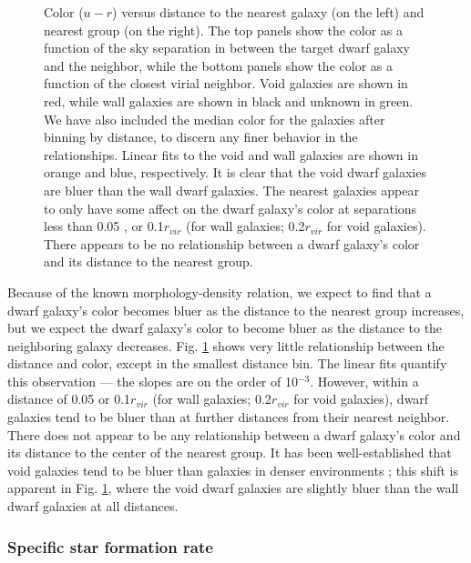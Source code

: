 \begin{figure}
    \caption[$u-r$ versus distance to nearest neighbor and group]{Color ($u-r$) 
    versus distance to the nearest galaxy (on the left) and nearest group (on 
    the right).  The top panels show the color as a function of the sky 
    separation in \hMpc between the target dwarf galaxy and the neighbor, while 
    the bottom panels show the color as a function of the closest virial 
    neighbor.  Void galaxies are shown in red, while wall galaxies are shown in 
    black and unknown in green.  We have also included the median color for the 
    galaxies after binning by distance, to discern any finer behavior in the 
    relationships.  Linear fits to the void and wall galaxies are shown in 
    orange and blue, respectively.  It is clear that the void dwarf galaxies are 
    bluer than the wall dwarf galaxies.  The nearest galaxies appear to only 
    have some affect on the dwarf galaxy's color at separations less than 0.05 
    \hMpc, or 0.1$r_{vir}$ (for wall galaxies; 0.2$r_{vir}$ for void galaxies).  
    There appears to be no relationship between a dwarf galaxy's color and its 
    distance to the nearest group.}
    \label{fig:ur}
\end{figure}

Because of the known morphology-density relation, we expect to find that a dwarf 
galaxy's color becomes bluer as the distance to the nearest group increases, but 
we expect the dwarf galaxy's color to become bluer as the distance to the 
neighboring galaxy decreases.  Fig. \ref{fig:ur} shows very little relationship 
between the distance and color, except in the smallest distance bin.  The linear 
fits quantify this observation --- the slopes are on the order of 10$^{-3}$.  
However, within a distance of 0.05 \hMpc or 0.1$r_{vir}$ (for wall galaxies; 
0.2$r_{vir}$ for void galaxies), dwarf galaxies tend to be bluer than at further 
distances from their nearest neighbor.  There does not appear to be any 
relationship between a dwarf galaxy's color and its distance to the center of 
the nearest group.  It has been well-established that void galaxies tend to be 
bluer than galaxies in denser environments \citep{Grogin99,Rojas04,Patiri06,
vonBendaBeckmann08,Hoyle12}; this shift is apparent in Fig. \ref{fig:ur}, where 
the void dwarf galaxies are slightly bluer than the wall dwarf galaxies at all 
distances.  


\subsubsection{Specific star formation rate}

